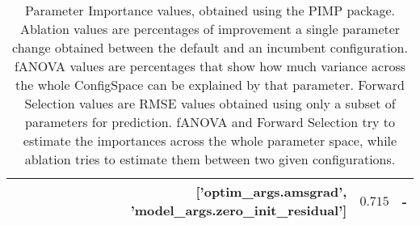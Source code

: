 \begin{table}
\begin{tabular}{r|r|r}
['optim_args.amsgrad', 'model_args.zero_init_residual']      & $ 0.715$ &      -\\
\bottomrule
\end{tabular}
\caption{Parameter Importance values, obtained using the PIMP package. Ablation values are percentages of improvement a single parameter change obtained between the default and an incumbent configuration.
fANOVA values are percentages that show how much variance across the whole ConfigSpace can be explained by that parameter.
Forward Selection values are RMSE values obtained using only a subset of parameters for prediction.
fANOVA and Forward Selection try to estimate the importances across the whole parameter space, while ablation tries to estimate them between two given configurations.}
\label{tab:pimp}
\end{table}
